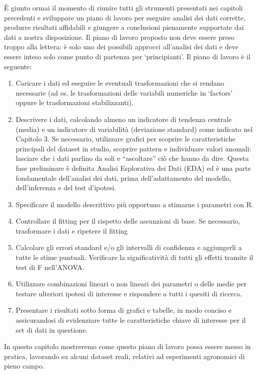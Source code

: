 \documentclass[
  12pt,
]{book}
\providecommand{\tightlist}{%
  \setlength{\itemsep}{0pt}\setlength{\parskip}{0pt}}
\begin{document}
È giunto ormai il momento di riunire tutti gli strumenti presentati nei capitoli precedenti e sviluppare un piano di lavoro per eseguire analisi dei dati corrette, produrre risultati affidabili e giungere a conclusioni pienamente supportate dai dati a nostra disposizione. Il piano di lavoro proposto non deve essere preso troppo alla lettera: è solo uno dei possibili approcci all'analisi dei dati e deve essere inteso solo come punto di partenza per `principianti'. Il piano di lavoro è il seguente:

\begin{enumerate}
\def\labelenumi{\arabic{enumi}.}
\tightlist
\item
  Caricare i dati ed eseguire le eventuali trasformazioni che si rendano necessarie (ad es. le trasformazioni delle variabili numeriche in `factors' oppure le trasformazioni stabilizzanti).
\item
  Descrivere i dati, calcolando almeno un indicatore di tendenza centrale (media) e un indicatore di variabilità (deviazione standard) come indicato nel Capitolo 3. Se necessario, utilizzare grafici per scoprire le caratteristiche principali del dataset in studio, scoprire pattern e individuare valori anomali: lasciare che i dati parlino da soli e ``ascoltare'' ciò che hanno da dire. Questa fase preliminare è definita Analisi Esplorativa dei Dati (EDA) ed è una parte fondamentale dell'analisi dei dati, prima dell'adattamento del modello, dell'inferenza e del test d'ipotesi.
\item
  Specificare il modello descrittivo più opportuno a stimarne i parametri con R.
\item
  Controllare il fitting per il rispetto delle assunzioni di base. Se necessario, trasformare i dati e ripetere il fitting
\item
  Calcolare gli errori standard e/o gli intervalli di confidenza e aggiungerli a tutte le stime puntuali. Verificare la significatività di tutti gli effetti tramite il test di F nell'ANOVA.
\item
  Utilizzare combinazioni lineari o non lineari dei parametri o delle medie per testare ulteriori ipotesi di interesse e rispondere a tutti i quesiti di ricerca.
\item
  Presentare i risultati sotto forma di grafici e tabelle, in modo conciso e assicurandosi di evidenziare tutte le caratteristiche chiave di interesse per il set di dati in questione.
\end{enumerate}

In questo capitolo mostreremo come questo piano di lavoro possa essere messo in pratica, lavorando su alcuni dataset reali, relativi ad esperimenti agronomici di pieno campo.
\end{document}
